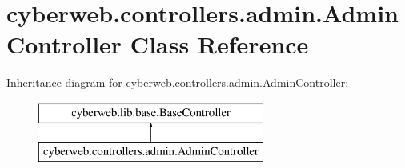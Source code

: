 \hypertarget{classcyberweb_1_1controllers_1_1admin_1_1_admin_controller}{\section{cyberweb.\-controllers.\-admin.\-Admin\-Controller \-Class \-Reference}
\label{classcyberweb_1_1controllers_1_1admin_1_1_admin_controller}
}
\-Inheritance diagram for cyberweb.\-controllers.\-admin.\-Admin\-Controller\-:\begin{figure}[H]
\begin{center}
\leavevmode
\includegraphics[height=2.000000cm]{classcyberweb_1_1controllers_1_1admin_1_1_admin_controller}
\end{center}
\end{figure}
